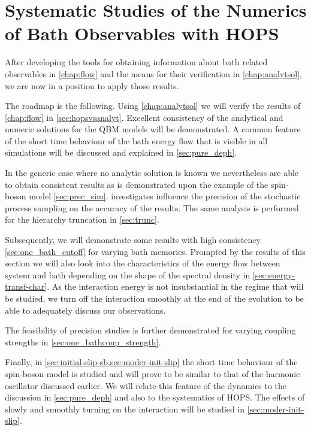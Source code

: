 \chapter{Systematic Studies of the Numerics of Bath Observables with
  HOPS}
\label{chap:numres}
After developing the tools for obtaining information about bath
related observables in \cref{chap:flow} and the means for their
verification in \cref{chap:analytsol}, we are now in a position to
apply those results.

The roadmap is the following. Using \cref{chap:analytsol} we will
verify the results of \cref{chap:flow} in
\cref{sec:hopsvsanalyt}. Excellent consistency of the analytical and
numeric solutions for the QBM models will be demonstrated.  A common
feature of the short time behaviour of the bath energy flow that is
visible in all simulations will be discussed and explained in
\cref{sec:pure_deph}.

In the generic case where no analytic solution is known we
nevertheless are able to obtain consistent results as is demonstrated
upon the example of the spin-boson model \cref{sec:prec_sim}.
 investigates influence the precision of the
stochastic process sampling on the accuracy of the results. The same
analysis is performed for the hierarchy truncation in
\cref{sec:trunc}.

Subsequently, we will demonstrate some results with high consistency
\cref{sec:one_bath_cutoff} for varying bath memories.  Prompted by the
results of this section we will also look into the characteristics of
the energy flow between system and bath depending on the shape of the
spectral density in \cref{sec:energy-transf-char}. As the interaction
energy is not insubstantial in the regime that will be studied, we
turn off the interaction smoothly at the end of the evolution to be
able to adequately discuss our observations.

The feasibility of precision studies is further demonstrated for
varying coupling strengths in \cref{sec:one_bathcoup_strength}.

Finally, in \cref{sec:initial-slip-sb,sec:moder-init-slip} the short
time behaviour of the spin-boson model is studied and will prove to be
similar to that of the harmonic oscillator discussed earlier. We will
relate this feature of the dynamics to the discussion in
\cref{sec:pure_deph} and also to the systematics of HOPS. The effects
of slowly and smoothly turning on the interaction will be studied in
\cref{sec:moder-init-slip}.

